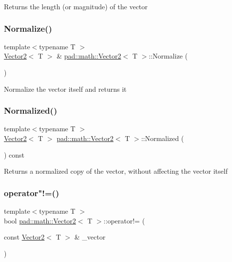 Returns the length (or magnitude) of the vector \mbox{\label{structpad_1_1math_1_1_vector2_a58d0df7fcb5f69cebce9e28fc94bf8f5}} 
\subsubsection{\texorpdfstring{Normalize()}{Normalize()}}
{\footnotesize\ttfamily template$<$typename T $>$ \\
\mbox{\hyperlink{structpad_1_1math_1_1_vector2}{Vector2}}$<$ T $>$ \& \mbox{\hyperlink{structpad_1_1math_1_1_vector2}{pad\+::math\+::\+Vector2}}$<$ T $>$\+::Normalize (\begin{DoxyParamCaption}{ }\end{DoxyParamCaption})}

Normalize the vector itself and returns it \mbox{\label{structpad_1_1math_1_1_vector2_ad940f1a2e4e6c58f742e85327493750a}} 
\subsubsection{\texorpdfstring{Normalized()}{Normalized()}}
{\footnotesize\ttfamily template$<$typename T $>$ \\
\mbox{\hyperlink{structpad_1_1math_1_1_vector2}{Vector2}}$<$ T $>$ \mbox{\hyperlink{structpad_1_1math_1_1_vector2}{pad\+::math\+::\+Vector2}}$<$ T $>$\+::Normalized (\begin{DoxyParamCaption}{ }\end{DoxyParamCaption}) const}

Returns a normalized copy of the vector, without affecting the vector itself \mbox{\label{structpad_1_1math_1_1_vector2_a3fc28d0cce711c660bf2b462aeaf41f2}} 
\subsubsection{\texorpdfstring{operator"!=()}{operator!=()}}
{\footnotesize\ttfamily template$<$typename T $>$ \\
bool \mbox{\hyperlink{structpad_1_1math_1_1_vector2}{pad\+::math\+::\+Vector2}}$<$ T $>$\+::operator!= (\begin{DoxyParamCaption}\item[{const \mbox{\hyperlink{structpad_1_1math_1_1_vector2}{Vector2}}$<$ T $>$ \&}]{\+\_\+vector }\end{DoxyParamCaption})}

